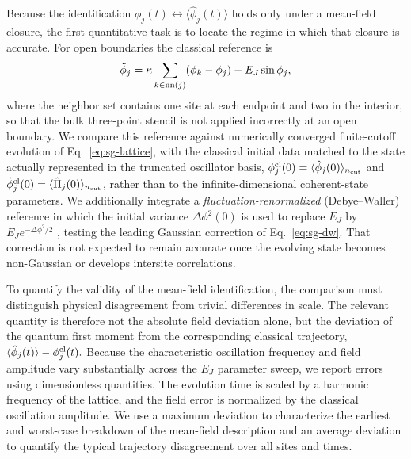 \documentclass[pra,twocolumn,superscriptaddress,nofootinbib,floatfix]{revtex4-2}
\theoremstyle{remark}
\begin{document}
Because the identification $\phi_j(t)\leftrightarrow\langle\hat\phi_j(t)\rangle$ holds only under a mean-field closure, the first quantitative task is to locate the regime in which that closure is accurate. For open boundaries the classical reference is
\begin{align}
\ddot\phi_j=\kappa\sum_{k\in{\rm nn}(j)}(\phi_k-\phi_j)-E_J\sin\phi_j,
\label{eq:sg-classical-eom}
\end{align}
where the neighbor set contains one site at each endpoint and two in the interior, so that the bulk three-point stencil is not applied incorrectly at an open boundary. We compare this reference against numerically converged finite-cutoff evolution of Eq.~\eqref{eq:sg-lattice}, with the classical initial data matched to the state actually represented in the truncated oscillator basis,
\(\phi_j^{\rm cl}(0)=\langle\hat\phi_j(0)\rangle_{n_{\rm cut}}\) and \(\dot\phi_j^{\rm cl}(0)=\langle\hat\Pi_j(0)\rangle_{n_{\rm cut}}\),
rather than to the infinite-dimensional coherent-state parameters. We additionally integrate a \emph{fluctuation-renormalized} (Debye--Waller) reference in which the initial variance \(\Delta\phi^2(0)\) is used to replace \(E_J\) by $E_Je^{-\Delta\phi^2/2}$ \cite{PhysRevLett.49.681}, testing the leading Gaussian correction of Eq.~\eqref{eq:sg-dw}. That correction is not expected to remain accurate once the evolving state becomes non-Gaussian or develops intersite correlations.

To quantify the validity of the mean-field identification, the comparison must distinguish physical disagreement from trivial differences in scale. The relevant quantity is therefore not the absolute field deviation alone, but the deviation of the quantum first moment from the corresponding classical trajectory,
\(\langle\hat\phi_j(t)\rangle-\phi_j^{\rm cl}(t).\)
Because the characteristic oscillation frequency and field amplitude vary substantially across the \(E_J\) parameter sweep, we report errors using dimensionless quantities. The evolution time is scaled by a harmonic frequency of the lattice, and the field error is normalized by the classical oscillation amplitude. We use a maximum deviation to characterize the earliest and worst-case breakdown of the mean-field description and an average deviation to quantify the typical trajectory disagreement over all sites and times.
\end{document}
